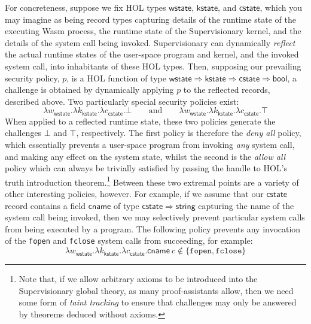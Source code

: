\documentclass[a4paper, UKenglish, cleveref, autoref, thm-restate, colorlinks]{lipics-v2021}
\newcommand{\lam}[1]{\lambda{#1}.}
\begin{document}
For concreteness, suppose we fix HOL types $\mathsf{wstate}$, $\mathsf{kstate}$, and $\mathsf{cstate}$, which you may imagine as being record types capturing details of the runtime state of the executing Wasm process, the runtime state of the Supervisionary kernel, and the details of the system call being invoked.
Supervisionary can dynamically \emph{reflect} the actual runtime states of the user-space program and kernel, and the invoked system call, into inhabitants of these HOL types.
Then, supposing our prevailing security policy, $p$, is a HOL function of type $\mathsf{wstate} \Rightarrow \mathsf{kstate} \Rightarrow \mathsf{cstate} \Rightarrow \mathsf{bool}$, a challenge is obtained by dynamically applying $p$ to the reflected records, described above.
Two particularly special security policies exist:
\begin{displaymath}
\lam{w_{\mathsf{wstate}}}\lam{k_{\mathsf{kstate}}}\lam{c_{\mathsf{cstate}}}\bot \qquad\text{and}\qquad \lam{w_{\mathsf{wstate}}}\lam{k_{\mathsf{kstate}}}\lam{c_{\mathsf{cstate}}}\top
\end{displaymath}
When applied to a reflected runtime state, these two policies generate the challenges $\bot$ and $\top$, respectively.
The first policy is therefore the \emph{deny all} policy, which essentially prevents a user-space program from invoking \emph{any} system call, and making any effect on the system state, whilst the second is the \emph{allow all} policy which can always be trivially satisfied by passing the handle to HOL's truth introduction theorem.\footnote{Note that, if we allow arbitrary axioms to be introduced into the Supervisionary global theory, as many proof-assistants allow, then we need some form of \emph{taint tracking} to ensure that challenges may only be answered by theorems deduced without axioms.}
Between these two extremal points are a variety of other interesting policies, however.
For example, if we assume that our $\mathsf{cstate}$ record contains a field $\mathsf{cname}$ of type $\mathsf{cstate} \Rightarrow \mathsf{string}$ capturing the name of the system call being invoked, then we may selectively prevent particular system calls from being executed by a program.
The following policy prevents any invocation of the \texttt{fopen} and \texttt{fclose} system calls from succeeding, for example:
\begin{displaymath}
\lam{w_{\mathsf{wstate}}}\lam{k_{\mathsf{kstate}}}\lam{c_{\mathsf{cstate}}}\mathsf{cname}\ c \notin \{ \mathtt{fopen}, \mathtt{fclose} \}
\end{displaymath}
\end{document}
